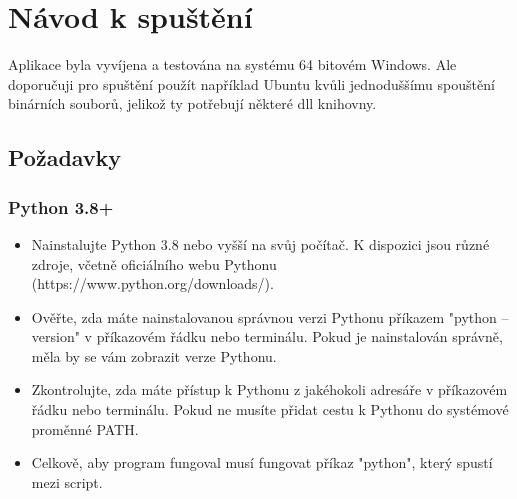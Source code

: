 \chapter{Návod k spuštění}
Aplikace byla vyvíjena a testována na systému 64 bitovém Windows. Ale doporučuji pro spuštění použít například Ubuntu kvůli jednoduššímu spouštění binárních souborů, jelikož ty potřebují některé dll knihovny. 
\section{Požadavky}
\subsection{Python 3.8+}
\begin{itemize}
    \item Nainstalujte Python 3.8 nebo vyšší na svůj počítač. K dispozici jsou různé zdroje, včetně oficiálního webu Pythonu (https://www.python.org/downloads/).

    \item Ověřte, zda máte nainstalovanou správnou verzi Pythonu příkazem "python --version" v příkazovém řádku nebo terminálu. Pokud je nainstalován správně, měla by se vám zobrazit verze Pythonu.
    
    \item Zkontrolujte, zda máte přístup k Pythonu z jakéhokoli adresáře v příkazovém řádku nebo terminálu. Pokud ne musíte přidat cestu k Pythonu do systémové proměnné PATH.
    \item Celkově, aby program fungoval musí fungovat příkaz "python", který spustí mezi script.
\end{itemize}
